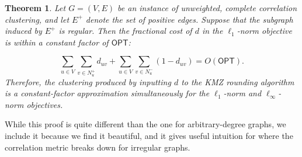 \documentclass[11pt]{article}
\newtheorem{theorem}{Theorem}
\begin{document}
\begin{theorem}
    Let $G=(V,E)$ be an instance of unweighted, complete correlation clustering, and let $E^+$ denote the set of positive edges. Suppose that the subgraph induced by $E^+$ is regular. Then the fractional cost of $d$ in the $\ell_1$-norm objective is within a constant factor of $\textsf{OPT}$:

    \[\sum_{u \in V} \sum_{v \in N_u^+} d_{uv} + \sum_{u \in V} \sum_{v \in N_u^-} (1-d_{uv}) = O(\textsf{OPT}).\]
    Therefore, the clustering produced by inputting $d$ to the KMZ rounding algorithm is a constant-factor approximation simultaneously for the $\ell_1$-norm and $\ell_{\infty}$-norm objectives. 
\end{theorem}

While this proof is quite different than the one for arbitrary-degree graphs,
we include it because we find it beautiful,
and it gives useful intuition for where the correlation metric breaks down for irregular graphs.
\end{document}

